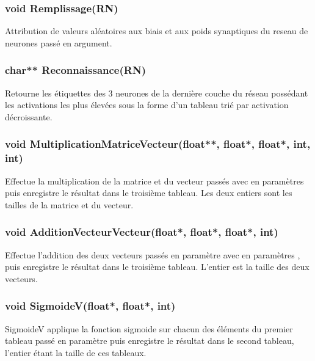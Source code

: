 \documentclass{article}
\begin{document}
		\subsubsection{\textcolor{myblue}{\textbf{void}} Remplissage(\textcolor{myblue}{\textbf{RN}})}
		Attribution de valeurs aléatoires aux biais et aux poids synaptiques du reseau de neurones passé en argument.
		
		\subsubsection{\textcolor{myblue}{\textbf{char**}} Reconnaissance(\textcolor{myblue}{\textbf{RN}})}
		Retourne les étiquettes des 3 neurones de la dernière couche du réseau possédant les activations les plus élevées sous la forme d'un tableau trié par activation décroissante.
		
		\subsubsection{\textcolor{myblue}{\textbf{void}} MultiplicationMatriceVecteur(\textcolor{myblue}{\textbf{float**}},  \textcolor{myblue}{\textbf{float*}},  \textcolor{myblue}{\textbf{float*}},  \textcolor{myblue}{\textbf{int}},  \textcolor{myblue}{\textbf{int}})}
		Effectue la multiplication de la matrice et du vecteur passés avec en paramètres puis enregistre le résultat dans le troisième tableau.
		Les deux entiers sont les tailles de la matrice et du vecteur.
		
		\subsubsection{\textcolor{myblue}{\textbf{void}} AdditionVecteurVecteur(\textcolor{myblue}{\textbf{float*}},  \textcolor{myblue}{\textbf{float*}},  \textcolor{myblue}{\textbf{float*}},  \textcolor{myblue}{\textbf{int}})}
		Effectue l'addition des deux vecteurs passés en paramètre avec en paramètres , puis enregistre le résultat dans le troisième tableau. L'entier est la taille des deux vecteurs.
		
		\subsubsection{\textcolor{myblue}{\textbf{void}} SigmoideV(\textcolor{myblue}{\textbf{float*}},  \textcolor{myblue}{\textbf{float*}},  \textcolor{myblue}{\textbf{int}})}
		SigmoideV applique la fonction sigmoide sur chacun des éléments du premier tableau passé en paramètre puis enregistre le résultat dans le second tableau, l'entier étant la taille de ces tableaux.
		
\end{document}
